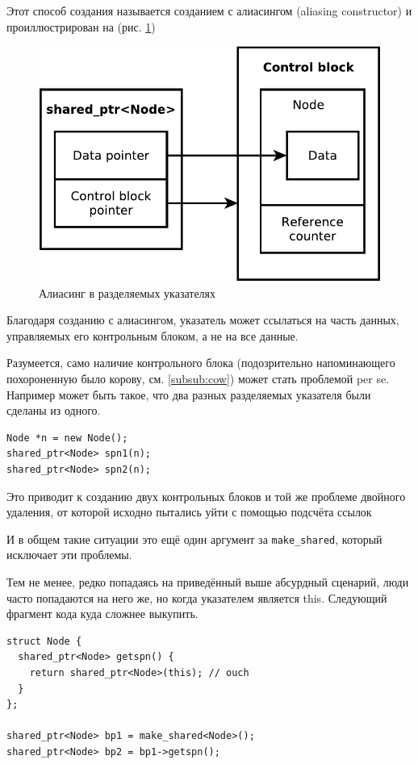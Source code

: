 \documentclass[a4paper,12pt,oneside]{article}
\begin{document}
Этот способ создания называется созданием с алиасингом (aliasing constructor) и проиллюстрирован на (рис. \ref{fig:smartptrs-aliased})

\begin{figure}[ht]
\centering
\includegraphics[width=1.0\textwidth]{illustrations/smartptrs-aliased-crop.pdf}
\caption{Алиасинг в разделяемых указателях}
\label{fig:smartptrs-aliased}
\end{figure}

Благодаря созданию с алиасингом, указатель может ссылаться на часть данных, управляемых его контрольным блоком, а не на все данные.

Разумеется, само наличие контрольного блока (подозрительно напоминающего похороненную было корову, см. \ref{subsub:cow}) может стать проблемой per se. Например может быть такое, что два разных разделяемых указателя были сделаны из одного.

\begin{lstlisting}
Node *n = new Node();
shared_ptr<Node> spn1(n);
shared_ptr<Node> spn2(n);
\end{lstlisting}

Это приводит к созданию двух контрольных блоков и той же проблеме двойного удаления, от которой исходно пытались уйти с помощью подсчёта ссылок

И в общем такие ситуации это ещё один аргумент за \lstinline!make_shared!, который исключает эти проблемы.

Тем не менее, редко попадаясь на приведённый выше абсурдный сценарий, люди часто попадаются на него же, но когда указателем является this. Следующий фрагмент кода куда сложнее выкупить.

\begin{lstlisting}
struct Node {
  shared_ptr<Node> getspn() {
    return shared_ptr<Node>(this); // ouch
  }
};

shared_ptr<Node> bp1 = make_shared<Node>();
shared_ptr<Node> bp2 = bp1->getspn();
\end{lstlisting}
\end{document}
